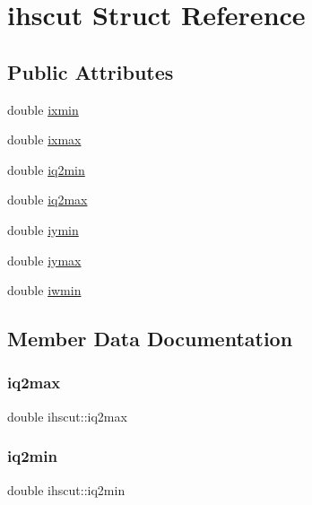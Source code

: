 \hypertarget{structihscut}{}\section{ihscut Struct Reference}
\label{structihscut}
\subsection*{Public Attributes}
\begin{DoxyCompactItemize}
\item 
double \hyperlink{structihscut_a5678e21c7e6fa3cc27175a5d2f2a0c7b}{ixmin}
\item 
double \hyperlink{structihscut_a20fe5bd4389c0fa0c2692397d9395bc0}{ixmax}
\item 
double \hyperlink{structihscut_a7e0f6cd53d2199ccd78055af35a7d19a}{iq2min}
\item 
double \hyperlink{structihscut_a5a1ed8fe1c6ed5a05f67f009f87a4b3e}{iq2max}
\item 
double \hyperlink{structihscut_a5d156345a0fe1ca2dbd3ed09b258b6c2}{iymin}
\item 
double \hyperlink{structihscut_a435b3d3dff4faf5e23379d384f9b0ff7}{iymax}
\item 
double \hyperlink{structihscut_a99892c106e212590c37e0e095c981b2a}{iwmin}
\end{DoxyCompactItemize}


\subsection{Member Data Documentation}
\mbox{\label{structihscut_a5a1ed8fe1c6ed5a05f67f009f87a4b3e}} 
\subsubsection{\texorpdfstring{iq2max}{iq2max}}
{\footnotesize\ttfamily double ihscut\+::iq2max}

\mbox{\label{structihscut_a7e0f6cd53d2199ccd78055af35a7d19a}} 
\subsubsection{\texorpdfstring{iq2min}{iq2min}}
{\footnotesize\ttfamily double ihscut\+::iq2min}

